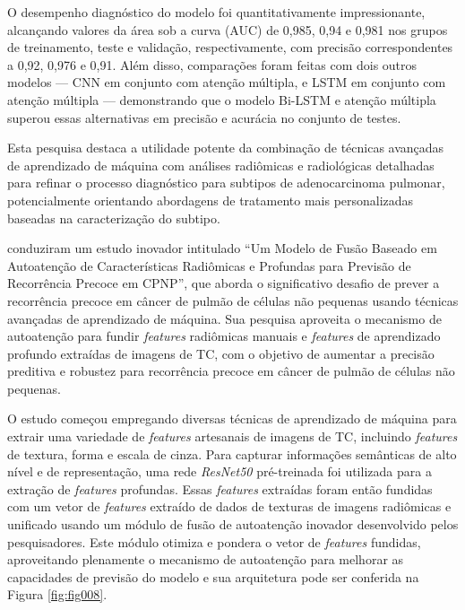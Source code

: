 O desempenho diagnóstico do modelo foi quantitativamente impressionante, alcançando valores da área sob a curva (AUC) de 0,985, 0,94 e 0,981 nos grupos de treinamento, teste e validação, respectivamente, com precisão correspondentes a 0,92, 0,976 e 0,91. Além disso, comparações foram feitas com dois outros modelos — \gls{CNN} em conjunto com atenção múltipla, e LSTM em conjunto com atenção múltipla — demonstrando que o modelo Bi-LSTM e atenção múltipla superou essas alternativas em precisão e acurácia no conjunto de testes.

Esta pesquisa destaca a utilidade potente da combinação de técnicas avançadas de aprendizado de máquina com análises radiômicas e radiológicas detalhadas para refinar o processo diagnóstico para subtipos de adenocarcinoma pulmonar, potencialmente orientando abordagens de tratamento mais personalizadas baseadas na caracterização do subtipo.

  conduziram um estudo inovador intitulado ``Um Modelo de Fusão Baseado em Autoatenção de Características Radiômicas e Profundas para Previsão de Recorrência Precoce em CPNP'', que aborda o significativo desafio de prever a recorrência precoce em câncer de pulmão de células não pequenas usando técnicas avançadas de aprendizado de máquina. Sua pesquisa aproveita o mecanismo de autoatenção para fundir \textit{features} radiômicas manuais e \textit{features} de aprendizado profundo extraídas de imagens de \gls{TC}, com o objetivo de aumentar a precisão preditiva e robustez para recorrência precoce em câncer de pulmão de células não pequenas.

O estudo começou empregando diversas técnicas de aprendizado de máquina para extrair uma variedade de \textit{features} artesanais de imagens de \gls{TC}, incluindo \textit{features} de textura, forma e escala de cinza. Para capturar informações semânticas de alto nível e de representação, uma rede \textit{ResNet50} pré-treinada foi utilizada para a extração de \textit{features} profundas. Essas \textit{features} extraídas foram então fundidas com um vetor de \textit{features} extraído de dados de texturas de imagens radiômicas e unificado usando um módulo de fusão de autoatenção inovador desenvolvido pelos pesquisadores. Este módulo otimiza e pondera o vetor de \textit{features} fundidas, aproveitando plenamente o mecanismo de autoatenção para melhorar as capacidades de previsão do modelo e sua arquitetura pode ser conferida na Figura \ref{fig:fig008}.

